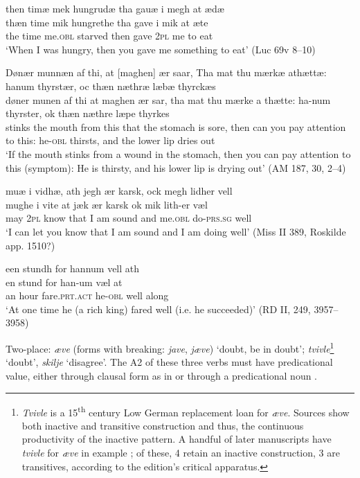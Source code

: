 \documentclass[output=paper]{langscibook}
\begin{document}
\begin{exe}
\ex \label{ex:heltoft:5}
    \glll then timæ mek hungrudæ tha gauæ i megh at ædæ \\
         thæn time  mik    hungrethe  tha   gave  i    mik  at  æte   \\
         the time   me.\textsc{obl}   starved  then   gave  \textsc{2pl}   me   to eat\\
    \glt  `When I was hungry, then you gave me something to eat' (Luc 69v 8--10)

\ex \label{ex:heltoft:6} 
    \glll Dønær munnæn af thi, at [maghen] ær saar, Tha mat thu mærkæ athættæ: hanum thyrstær, oc thæn næthræ læbæ thyrckæs\\
    døner 	munen 	af thi at 		maghen	ær sar, tha  mat 	thu 		mærke 	{a thætte}: ha-num  thyrster, ok thæn næthre læpe thyrkes\\
    stinks {the mouth} from this that {the stomach} is sore, then can you {pay attention} {to this}: he-\textsc{obl}  thirsts,   and   the lower lip       {dries out}\\
    \glt `If the mouth stinks from a wound in the stomach, then you can pay attention to this (symptom): He is thirsty, and his lower lip is drying out' (AM 187, 30, 2--4)

\ex \label{ex:heltoft:7}
    \glll muæ i vidhæ, ath jegh ær karsk, ock megh lidher vell  \\
         mughe   i     vite at     jæk ær karsk   ok    mik    lith-er     væl\\
         may   \textsc{2pl} know that   I   am sound    and   me.\textsc{obl}  do-\textsc{prs.sg} well\\
    \glt `I can let you know that I am sound and I am doing well' (Miss II 389, Roskilde app. 1510?)

\ex \label{ex:heltoft:8}
    \glll een stundh for hannum   vell ath \\
         en    stund    for          han-um    væl    at  \\
         an     hour    fare.\textsc{prt.act}    he-\textsc{obl}    well  along\\
    \glt `At one time he (a rich king) fared well (i.e. he succeeded)' (RD II, 249, 3957--3958)
\end{exe}

Two-place: \textit{æve} (forms with breaking: \textit{jave}, \textit{jæve}) `doubt, be in doubt'; \textit{tvivle}\footnote{\textit{Tvivle} is a 15\textsuperscript{th} century Low German replacement loan for \textit{æve}. Sources show both inactive and transitive construction and thus, the continuous productivity of the inactive pattern. A handful of later manuscripts have \textit{tvivle} for \textit{æve} in example ; of these, 4 retain an inactive construction, 3 are transitives, according to the edition's critical apparatus.} `doubt',  \textit{skilje} `disagree'. The A2 of these three verbs must have predicational value, either through clausal form as in  or through a predicational noun .
\end{document}

